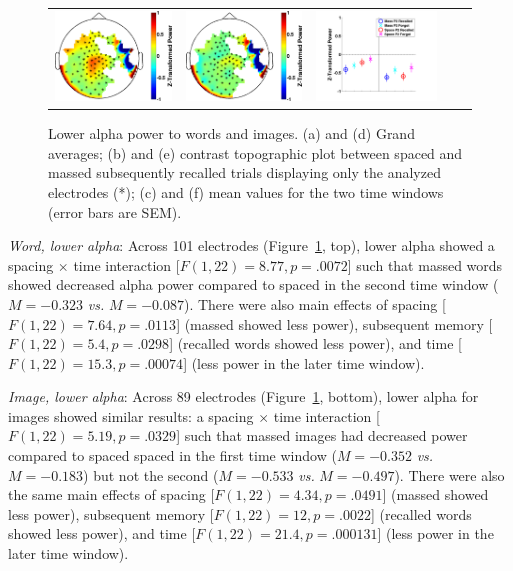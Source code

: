 \begin{figure}[H]
\begin{tabular}{ccccc}
  \includegraphics[width=.19\textwidth]{./figs/exp1/tfr_topocont_ga_img_RgH_rc_spac_p2vsimg_RgH_rc_mass_p2_89ROIs_8_10_0_500_-1p0_1p0_cb} &
  \includegraphics[width=.19\textwidth]{./figs/exp1/tfr_topocont_ga_img_RgH_rc_spac_p2vsimg_RgH_rc_mass_p2_89ROIs_8_10_520_1000_-1p0_1p0_cb} &
  \includegraphics[width=.30\textwidth]{./figs/exp1/tfr_avg_ga_img_RgH_rc_mass_p2_img_RgH_fo_mass_p2_img_RgH_rc_spac_p2_img_RgH_fo_spac_p2_89ROI_0_500_500_1000_8_10_ylabel} \\
  \end{tabular}
  \caption{Lower alpha power to words and images.  (a) and (d) Grand averages; (b) and (e) contrast topographic plot between spaced and massed subsequently recalled trials displaying only the analyzed electrodes (*); (c) and (f) mean values for the two time windows (error bars are SEM).}
  \label{fig:word_img_alpha_low}
\end{figure}

\textit{Word, lower alpha}: Across 101 electrodes (Figure~\ref{fig:word_img_alpha_low}, top), lower alpha showed a spacing $\times$ time interaction [$F(1,22)=8.77, p=.0072$] such that massed words showed decreased alpha power compared to spaced in the second time window ($M=-0.323$ \textit{vs.} $M=-0.087$).
There were also main effects of spacing [$F(1,22)=7.64, p=.0113$] (massed showed less power), subsequent memory [$F(1,22)=5.4, p=.0298$] (recalled words showed less power), and time [$F(1,22)=15.3, p=.00074$] (less power in the later time window).

\textit{Image, lower alpha}: Across 89 electrodes (Figure~\ref{fig:word_img_alpha_low}, bottom), lower alpha for images showed similar results: a spacing $\times$ time interaction [$F(1,22)=5.19, p=.0329$] such that massed images had decreased power compared to spaced spaced in the first time window ($M=-0.352$ \textit{vs.} $M=-0.183$) but not the second ($M=-0.533$ \textit{vs.} $M=-0.497$).
There were also the same main effects of spacing [$F(1,22)=4.34, p=.0491$] (massed showed less power), subsequent memory [$F(1,22)=12, p=.0022$] (recalled words showed less power), and time [$F(1,22)=21.4, p=.000131$] (less power in the later time window).

